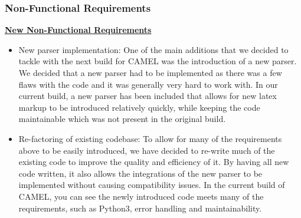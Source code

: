 	\subsubsection*{Non-Functional Requirements}
	\underline{\textbf{New Non-Functional Requirements}}
	\begin{itemize}
		
		\item New parser implementation: One of the main additions that we decided to tackle with the next build for CAMEL was the introduction of a new parser. We decided that a new parser had to be implemented as there was a few flaws with the code and it was generally very hard to work with. In our current build, a new parser has been included that allows for new latex markup to be introduced relatively quickly, while keeping the code maintainable which was not present in the original build.    
		
		\item Re-factoring of existing codebase: To allow for many of the requirements above to be easily introduced, we have decided to re-write much of the existing code to improve the quality and efficiency of it. By having all new code written, it also allows the integrations of the new parser to be implemented without causing compatibility issues. In the current build of CAMEL, you can see the newly introduced code meets many of the requirements, such as Python3, error handling and maintainability. 
	\end{itemize}
	

